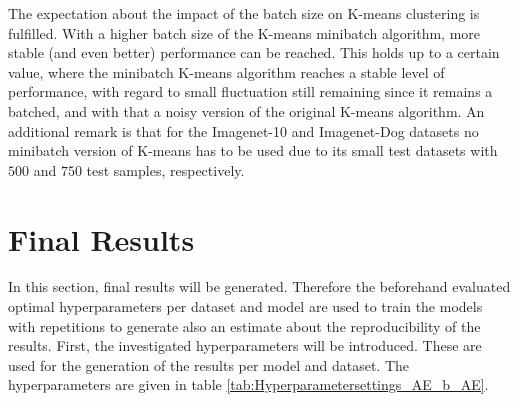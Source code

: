 \documentclass[12pt,DIV14,BCOR12mm,a4paper,footexclude,headinclude,halfparskip-,twoside,openright,cleardoubleempty,idxtotoc,bibtotoc,listtotoc,abstracton]{scrreprt} %
\numberwithin{equation}{chapter}
\begin{document}
The expectation about the impact of the batch size on K-means clustering is fulfilled. With a higher batch size of the K-means minibatch algorithm, more stable (and even better) performance can be reached. This holds up to a certain value, where the minibatch K-means algorithm reaches a stable level of performance, with regard to small fluctuation still remaining since it remains a batched, and with that a noisy version of the original K-means algorithm. An additional remark is that for the Imagenet-10 and Imagenet-Dog datasets no minibatch version of K-means has to be used due to its small test datasets with $500$ and $750$ test samples, respectively.
\section{Final Results}
In this section, final results will be generated. Therefore the beforehand evaluated optimal hyperparameters per dataset and model are used to train the models with repetitions to generate also an estimate about the reproducibility of the results. First, the investigated hyperparameters will be introduced. These are used for the generation of the results per model and dataset. The hyperparameters are given in table \ref{tab:Hyperparametersettings_AE_b_AE}.
\end{document}
